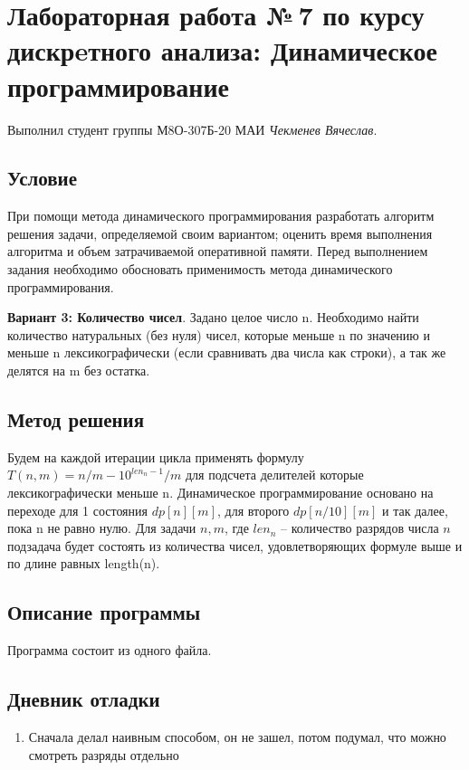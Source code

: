 \documentclass[12pt]{article}
\begin{document}
    \section*{Лабораторная работа №\,7 по курсу дискрeтного анализа: 
    Динамическое программирование}

    Выполнил студент группы М8О-307Б-20 МАИ \textit{Чекменев Вячеслав}.

    \subsection*{Условие}
 
     \item При помощи метода динамического программирования разработать алгоритм 
    решения задачи, определяемой своим вариантом; оценить время выполнения 
    алгоритма и объем затрачиваемой оперативной памяти. Перед выполнением 
    задания необходимо обосновать применимость метода динамического 
    программирования.
    \item \textbf{Вариант 3: Количество чисел}.
    Задано целое число n. Необходимо найти количество натуральных (без нуля) чисел, которые меньше n по
значению и меньше n лексикографически (если сравнивать два числа как строки), а так же делятся на m без
остатка.

    \subsection*{Метод решения}
Будем на каждой итерации цикла применять формулу $T(n,m) = n/m - 10^{len_n-1}/m$ для подсчета делителей которые лексикографически меньше n. Динамическое программирование основано на переходе для 1 состояния $dp[n][m]$, для второго $dp[n/10][m]$ и так далее, пока n не равно нулю. 
Для задачи $n, m$, где $len_n$ -- количество разрядов числа $n$ подзадача будет состоять из количества чисел, удовлетворяющих формуле выше и по длине равных length(n).


    \subsection*{Описание программы}

    Программа состоит из одного файла.

    \subsection*{Дневник отладки}

    \begin{enumerate}
    \item Сначала делал наивным способом, он не зашел, потом подумал, что можно смотреть разряды отдельно
    \end{enumerate}
\end{document}
